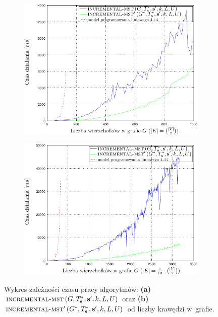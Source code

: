 \begin{figure}[!htbp]
	\renewcommand\figurename{Wykres}
	\null\hfill
	\begin{subfigure}[b]{0.45\textwidth}
		\includegraphics[width=\textwidth]{Chapter_VI/IMST1-example/IMST1_psfrag}
		\caption{}
		\label{fig:imst1:a}
	\end{subfigure}
	\hfill
	\begin{subfigure}[b]{0.45\textwidth}
		\includegraphics[width=\textwidth]{Chapter_VI/IMST3-example/IMST3_psfrag}
		\caption{}
		\label{fig:imst1:c}
	\end{subfigure}
	\hfill\null
	\caption{
		Wykres zależności czasu pracy algorytmów: \textbf{(a)}~$\textsc{incremental-mst} \left( G, T^{\ast}_{\textbf{s}}, \textbf{s}^{\prime}, k, L, U \right)$ oraz \textbf{(b)}~$\textsc{incremental-mst}^{\prime} \left( G^{\ast}, T^{\ast}_{\textbf{s}}, \textbf{s}^{\prime}, k, L, U \right)$ od liczby krawędzi w~grafie.
	}
	\label{fig:imst1}
\end{figure}

